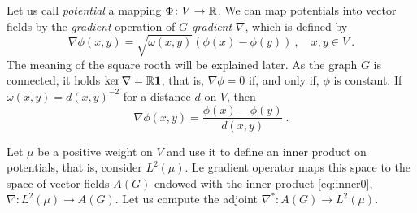 \documentclass[12pt,a4paper]{amsart}
\begin{document}
Let us call \emph{potential} a mapping $\Phi \colon V \to \mathbb{R}$. We
can map potentials into vector fields by the \emph{gradient} operation
of \emph{$G$-gradient} $\nabla$, which is defined by
\begin{equation*}
  \nabla \phi(x,y) = \sqrt {\omega(x,y)} (\phi(x) - \phi(y)) \ , \quad
  x,y \in V \ .
\end{equation*}
The meaning of the square rooth will be explained later. As the graph
$G$ is connected, it holds $\ker \nabla = \mathbb{R} \bm 1$, that is,
$\nabla\phi=0$ if, and only if, $\phi$ is constant. If
$\omega(x,y) = d(x,y)^{-2}$ for a distance $d$ on $V$, then
\begin{equation*}
  \nabla \phi (x,y)=\frac{\phi(x) - \phi(y)}{d(x,y)} \ .
\end{equation*}

Let $\mu$ be a positive weight on $V$ and use it to define an inner
product on potentials, that is, consider $L^2(\mu)$. Le gradient
operator maps this space to the space of vector fields $A(G)$ endowed
with the inner product \eqref{eq:inner0}, $\nabla \colon L^2(\mu) \to A(G)$.
Let us compute the adjoint $\nabla^* \colon A(G) \to L^2(\mu)$.

\end{document}
